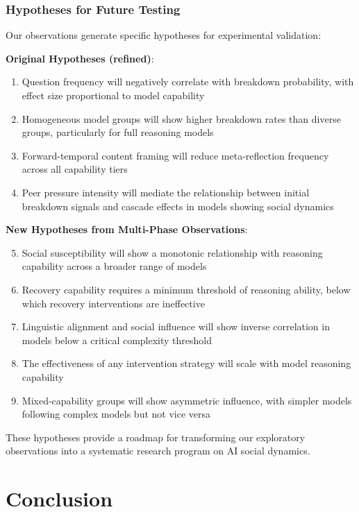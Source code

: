 \documentclass[11pt,letterpaper]{article}
\begin{document}
\subsubsection{Hypotheses for Future Testing}

Our observations generate specific hypotheses for experimental validation:

\textbf{Original Hypotheses (refined)}:
\begin{enumerate}
    \item Question frequency will negatively correlate with breakdown probability, with effect size proportional to model capability
    \item Homogeneous model groups will show higher breakdown rates than diverse groups, particularly for full reasoning models
    \item Forward-temporal content framing will reduce meta-reflection frequency across all capability tiers
    \item Peer pressure intensity will mediate the relationship between initial breakdown signals and cascade effects in models showing social dynamics
\end{enumerate}

\textbf{New Hypotheses from Multi-Phase Observations}:
\begin{enumerate}
    \setcounter{enumi}{4}
    \item Social susceptibility will show a monotonic relationship with reasoning capability across a broader range of models
    \item Recovery capability requires a minimum threshold of reasoning ability, below which recovery interventions are ineffective
    \item Linguistic alignment and social influence will show inverse correlation in models below a critical complexity threshold
    \item The effectiveness of any intervention strategy will scale with model reasoning capability
    \item Mixed-capability groups will show asymmetric influence, with simpler models following complex models but not vice versa
\end{enumerate}

These hypotheses provide a roadmap for transforming our exploratory observations into a systematic research program on AI social dynamics.

\section{Conclusion}
\end{document}
